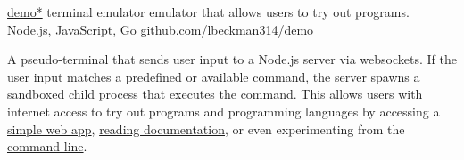 \showoff
{\textcolor{my-blue}{\href{https://liambeckman.com/code/demo}{demo*}}}
{terminal emulator emulator that allows users to try out programs.}
{Node.js, JavaScript, Go}
{\textcolor{my-blue}{\href{https://github.com/lbeckman314/demo}{github.com/lbeckman314/demo}}}

A pseudo-terminal that sends user input to a Node.js server via websockets. If the user input matches a predefined or available command, the server spawns a sandboxed child process that executes the command. This allows users with internet access to try out programs and programming languages by accessing a \textcolor{my-blue}{\href{https://voyager-index.herokuapp.com}{simple web app}}, \textcolor{my-blue}{\href{https://liambeckman.com/code/demo/client-example.html}{reading documentation}}, or even experimenting from the \textcolor{my-blue}{\href{https://github.com/lbeckman314/demo-go.git}{command line}}.

\myBreak
